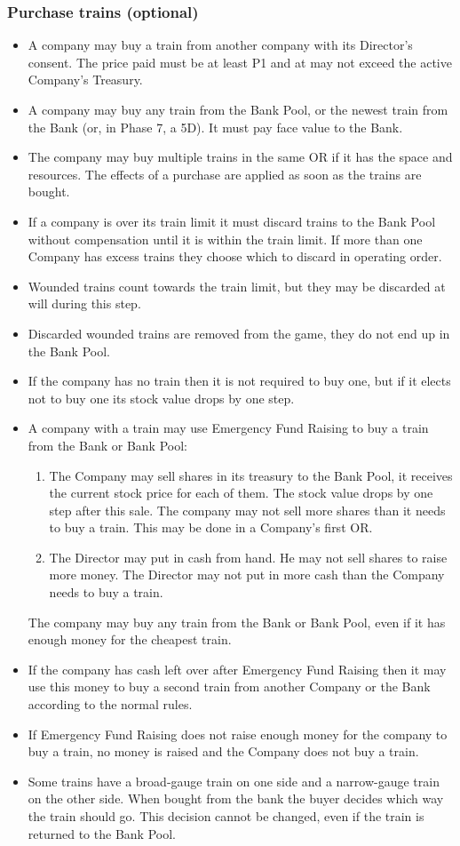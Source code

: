\documentclass[a4paper,twocolumn]{article}
\begin{document}
\subsubsection{Purchase trains (optional)}
\begin{itemize}
	\item A company may buy a train from another company with its Director's
	consent. The price paid must be at least P1 and at may not exceed the active
	Company's Treasury.
	\item A company may buy any train from the Bank Pool, or the newest train
	from the Bank (or, in Phase 7, a 5D). It must pay face value to the Bank.
	\item The company may buy multiple trains in the same OR if it has the space
	and resources. The effects of a purchase are applied as soon as the trains
	are bought.
	\item If a company is over its train limit it must discard trains to the
	Bank Pool without compensation until it is within the train limit. If more
	than one Company has excess trains they choose which to discard in operating
	order.
	\item Wounded trains count towards the train limit, but they may be
	discarded at will during this step.
	\item Discarded wounded trains are removed from the game, they do not end up
	in the Bank Pool.
	\item If the company has no train then it is not required to buy one, but if
	it elects not to buy one its stock value drops by one step.
	\item A company with a train may use Emergency Fund Raising to buy a train
	from the Bank or Bank Pool:
	\begin{enumerate}
		\item The Company may sell shares in its treasury to the Bank Pool, it
		receives the current stock price for each of them. The stock value drops
		by one step after this sale. The company may not sell more shares than
		it needs to buy a train. This may be done in a Company's first OR.
		\item The Director may put in cash from hand. He may not sell shares to
		raise more money. The Director may not put in more cash than the Company
		needs to buy a train.
	\end{enumerate}
	The company may buy any train from the Bank or Bank Pool, even if it has
	enough money for the cheapest train.
	\item If the company has cash left over after Emergency Fund Raising then it
	may use this money to buy a second train from another Company or the Bank
	according to the normal rules.
	\item If Emergency Fund Raising does not raise enough money for the company
	to buy a train, no money is raised and the Company does not buy a train.
	\item Some trains have a broad-gauge train on one side and a narrow-gauge
	train on the other side. When bought from the bank the buyer decides which
	way the train should go. This decision cannot be changed, even if the train
	is returned to the Bank Pool.
\end{itemize}
\end{document}
